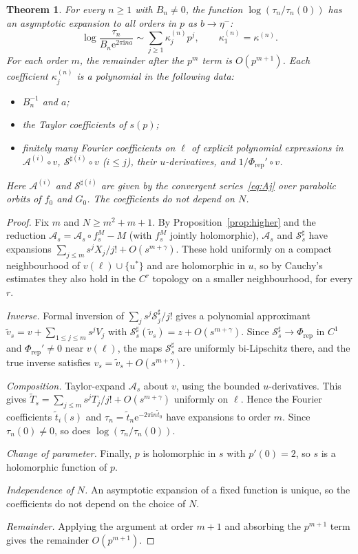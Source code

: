 \documentclass[11pt]{amsart}
\newtheorem{theorem}{Theorem}[section]
\theoremstyle{definition}
\newcommand{\eee}{\mathrm{e}}
\newcommand{\ii}{\mathrm{i}}
\begin{document}
\begin{theorem}\label{thm:E}
For every $n\ge1$ with $B_n\ne0$, the function $\log(\tau_n/\tau_n(0))$ has an
asymptotic expansion to all orders in $p$ as $b\to\eta^-$:
\[
 \log\frac{\tau_n}{B_n\eee^{2\pi\ii na}}\sim\sum_{j\ge1}\kappa^{(n)}_jp^j,\qquad
 \kappa^{(n)}_1=\kappa^{(n)} .
\]
For each order $m$, the remainder after the $p^m$ term is $O(p^{m+1})$.
Each coefficient $\kappa^{(n)}_j$ is a polynomial in the following data:
\begin{itemize}
\item $B_n^{-1}$ and $a$;
\item the Taylor coefficients of $s(p)$;
\item finitely many Fourier coefficients on $\ell$ of explicit polynomial
  expressions in $\mathcal A^{(i)}\circ v$, $\mathcal S^{\sharp(i)}\circ v$
  ($i\le j$), their $u$-derivatives, and $1/\Phi_{\mathrm{rep}}'\circ v$.
\end{itemize}
Here $\mathcal A^{(i)}$ and $\mathcal S^{\sharp(i)}$ are given by the convergent
series~\eqref{eq:Aj} over parabolic orbits of $f_0$ and $G_0$.  The coefficients
do not depend on $N$.
\end{theorem}

\begin{proof}
Fix $m$ and $N\ge m^2+m+1$.  By Proposition~\ref{prop:higher} and the reduction
$\mathcal A_s=\mathcal A_s\circ f_s^{M}-M$ (with $f_s^{M}$ jointly holomorphic),
$\mathcal A_s$ and $\mathcal S^\sharp_s$ have expansions
$\sum_{j\le m}s^jX_j/j!+O(s^{m+\gamma})$.  These hold uniformly on a compact
neighbourhood of $v(\ell)\cup\{u^*\}$ and are holomorphic in $u$, so by Cauchy's
estimates they also hold in the $C^r$ topology on a smaller neighbourhood, for
every $r$.

\emph{Inverse.}  Formal inversion of
$\sum_js^j\mathcal S^\sharp_j/j!$ gives a polynomial approximant
$\tilde v_s=v+\sum_{1\le j\le m}s^jV_j$ with
$\mathcal S^\sharp_s(\tilde v_s)=z+O(s^{m+\gamma})$.  Since
$\mathcal S^\sharp_s\to\Phi_{\mathrm{rep}}$ in $C^1$ and $\Phi_{\mathrm{rep}}'\ne0$
near $v(\ell)$, the maps $\mathcal S^\sharp_s$ are uniformly bi-Lipschitz there,
and the true inverse satisfies $v_s=\tilde v_s+O(s^{m+\gamma})$.

\emph{Composition.}  Taylor-expand $\mathcal A_s$ about $v$, using the bounded
$u$-derivatives.  This gives $\tilde T_s=\sum_{j\le m}s^jT_j/j!+O(s^{m+\gamma})$
uniformly on $\ell$.  Hence the Fourier coefficients $\tilde t_i(s)$ and
$\tau_n=\tilde t_n\eee^{-2\pi\ii n\tilde t_0}$ have expansions to order $m$.
Since $\tau_n(0)\ne0$, so does $\log(\tau_n/\tau_n(0))$.

\emph{Change of parameter.}  Finally, $p$ is holomorphic in $s$ with
$p'(0)=2$, so $s$ is a holomorphic function of $p$.

\emph{Independence of $N$.}  An asymptotic expansion of a fixed function is
unique, so the coefficients do not depend on the choice of $N$.

\emph{Remainder.}  Applying the argument at order $m+1$ and absorbing the
$p^{m+1}$ term gives the remainder $O(p^{m+1})$.
\end{proof}
\end{document}
